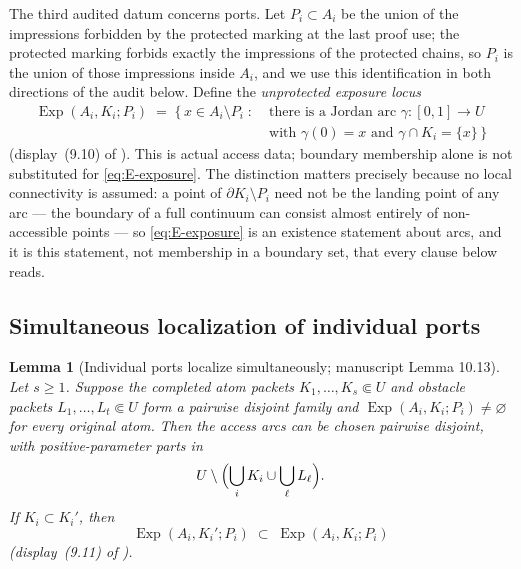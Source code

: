 \documentclass[11pt,reqno]{amsart}
\newtheorem{lemma}[theorem]{Lemma}
\theoremstyle{definition}
\theoremstyle{remark}
\newcommand{\Exp}{\operatorname{Exp}}
\begin{document}
The third audited datum concerns ports. Let $P_i\subset A_i$ be the union of the
impressions forbidden by the protected marking at the last proof use; the protected
marking forbids exactly the impressions of the protected chains, so $P_i$ is the
union of those impressions inside $A_i$, and we use this identification in both
directions of the audit below. Define the
\emph{unprotected exposure locus}
\begin{equation}\label{eq:E-exposure}
\begin{aligned}
\Exp(A_i,K_i;P_i)\;=\;
\bigl\{\,x\in A_i\setminus P_i \;:\;{}&
\text{there is a Jordan arc }\gamma\colon[0,1]\to U\\
&\text{with }\gamma(0)=x
\text{ and }\gamma\cap K_i=\{x\}\,\bigr\}
\end{aligned}
\end{equation}
(display~(9.10) of \cite{MWman}). This is actual access data; boundary membership
alone is not substituted for \eqref{eq:E-exposure}. The distinction matters
precisely because no local connectivity is assumed: a point of
$\partial K_i\setminus P_i$ need not be the landing point of any arc --- the
boundary of a full continuum can consist almost entirely of non-accessible points
\cite{Pom92} --- so \eqref{eq:E-exposure} is an existence statement about arcs, and
it is this statement, not membership in a boundary set, that every clause below
reads.

\subsection{Simultaneous localization of individual ports}\label{subsec:E-localization}

\begin{lemma}[Individual ports localize simultaneously; manuscript Lemma
10.13]\label{lem:port-localization}
Let $s\ge1$.  Suppose the completed atom packets
$K_1,\dots,K_s\Subset U$ and obstacle packets
$L_1,\dots,L_t\Subset U$ form a pairwise disjoint family and
$\Exp(A_i,K_i;P_i)\neq\varnothing$ for every original atom. Then the access arcs can
be chosen pairwise disjoint, with positive-parameter parts in
\[
U\setminus\Bigl(\bigcup_{i}K_i\cup\bigcup_{\ell}L_\ell\Bigr).
\]
If $K_i\subset K_i'$, then
\begin{equation}\label{eq:E-exposure-monotone}
\Exp(A_i,K_i';P_i)\;\subset\;\Exp(A_i,K_i;P_i)
\end{equation}
(display~(9.11) of \cite{MWman}).
\end{lemma}
\end{document}
